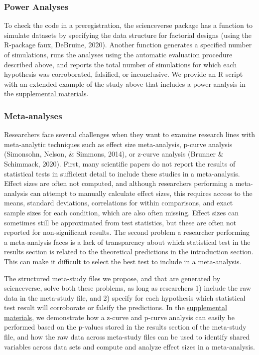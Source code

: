 \documentclass[
  english,
  doc,floatsintext]{apa6}
\begin{document}
\hypertarget{power-analyses}{%
\subsubsection{Power Analyses}\label{power-analyses}}

To check the code in a preregistration, the scienceverse package has a function to simulate datasets by specifying the data structure for factorial designs (using the R-package faux, DeBruine, 2020). Another function generates a specified number of simulations, runs the analyses using the automatic evaluation procedure described above, and reports the total number of simulations for which each hypothesis was corroborated, falsified, or inconclusive. We provide an R script with an extended example of the study above that includes a power analysis in the \href{example/extended/ext_example.Rmd}{supplemental materials}.

\hypertarget{meta-analyses}{%
\subsubsection{Meta-analyses}\label{meta-analyses}}

Researchers face several challenges when they want to examine research lines with meta-analytic techniques such as effect size meta-analysis, p-curve analysis (Simonsohn, Nelson, \& Simmons, 2014), or z-curve analysis (Brunner \& Schimmack, 2020). First, many scientific papers do not report the results of statistical tests in sufficient detail to include these studies in a meta-analysis. Effect sizes are often not computed, and although researchers performing a meta-analysis can attempt to manually calculate effect sizes, this requires access to the means, standard deviations, correlations for within comparisons, and exact sample sizes for each condition, which are also often missing. Effect sizes can sometimes still be approximated from test statistics, but these are often not reported for non-significant results. The second problem a researcher performing a meta-analysis faces is a lack of transparency about which statistical test in the results section is related to the theoretical predictions in the introduction section. This can make it difficult to select the best test to include in a meta-analysis.

The structured meta-study files we propose, and that are generated by scienceverse, solve both these problems, as long as researchers 1) include the raw data in the meta-study file, and 2) specify for each hypothesis which statistical test result will corroborate or falsify the predictions. In the \href{example/meta_example/meta-vignette.html}{supplemental materials}, we demonstrate how a z-curve and p-curve analysis can easily be performed based on the p-values stored in the results section of the meta-study file, and how the raw data across meta-study files can be used to identify shared variables across data sets and compute and analyze effect sizes in a meta-analysis.
\end{document}
